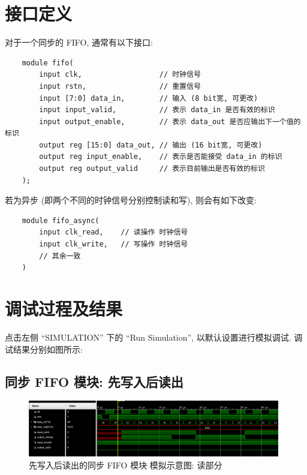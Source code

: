 \documentclass{article}
\begin{document}
\section{接口定义}

对于一个同步的 FIFO, 通常有以下接口:

\begin{lstlisting}
    module fifo(
        input clk,                  // 时钟信号
        input rstn,                 // 重置信号
        input [7:0] data_in,        // 输入 (8 bit宽, 可更改)
        input input_valid,          // 表示 data_in 是否有效的标识
        input output_enable,        // 表示 data_out 是否应输出下一个值的标识
        output reg [15:0] data_out, // 输出 (16 bit宽, 可更改)
        output reg input_enable,    // 表示是否能接受 data_in 的标识
        output reg output_valid     // 表示目前输出是否有效的标识
    );
\end{lstlisting}

若为异步 (即两个不同的时钟信号分别控制读和写), 则会有如下改变:

\begin{lstlisting}
    module fifo_async(
        input clk_read,    // 读操作 时钟信号
        input clk_write,   // 写操作 时钟信号
        // 其余一致
    )
\end{lstlisting}

\section{调试过程及结果}

点击左侧 ``SIMULATION'' 下的 ``Run Simulation'', 以默认设置进行模拟调试. 调试结果分别如图所示:

\subsection{同步 FIFO 模块: 先写入后读出}

\begin{figure}[H]
    \centering
    \includegraphics[width=0.98\textwidth]{assets/Fifo-0-1.png}
    \caption{先写入后读出的同步 FIFO 模块 模拟示意图: 读部分}
\end{figure}
\end{document}
